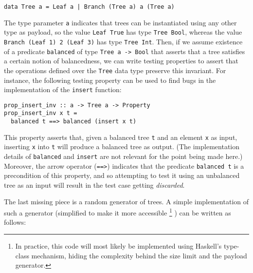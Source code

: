 \documentclass[sigconf, anonymous, review]{acmart}
\newcommand{\quickcheck}{\textit{QuickCheck}\xspace}
\begin{document}
\begin{verbatim}
data Tree a = Leaf a | Branch (Tree a) a (Tree a)
\end{verbatim}

\noindent The type parameter \texttt{a} indicates that trees can be instantiated
using any other type as payload, so the value \texttt{Leaf True} has type
\texttt{Tree Bool}, whereas the value \texttt{Branch (Leaf 1) 2 (Leaf 3)} has
type \texttt{Tree Int}.
%
%
%
%
Then, if we assume existence of a predicate \texttt{balanced} of type
\texttt{Tree a -> Bool} that asserts that a tree satisfies a certain notion of
balancedness, we can write testing properties to assert that the operations
defined over the \texttt{Tree} data type preserve this invariant.
%
For instance, the following testing property can be used to find bugs in the
implementation of the \texttt{insert} function:

\begin{verbatim}
prop_insert_inv :: a -> Tree a -> Property
prop_insert_inv x t =
  balanced t ==> balanced (insert x t)
\end{verbatim}


\noindent This property asserts that, given a balanced tree \texttt{t} and an
element \texttt{x} as input, inserting \texttt{x} into \texttt{t} will produce a
balanced tree as output.
%
(The implementation details of \texttt{balanced} and \texttt{insert} are not
relevant for the point being made here.)
%
Moreover, the arrow operator (\texttt{==>}) indicates that the predicate
\texttt{balanced t} is a precondition of this property, and so attempting to
test it using an unbalanced tree as an input will result in the test case
getting \emph{discarded}.


The last missing piece is a random generator of trees.
%
A simple implementation of such a generator (simplified to make it more
accessible%
\footnote{In practice, this code will most likely be implemented using Haskell's
  type-class mechanism, hiding the complexity behind the size limit and the payload generator.}%
) can be written as follows:
\end{document}

